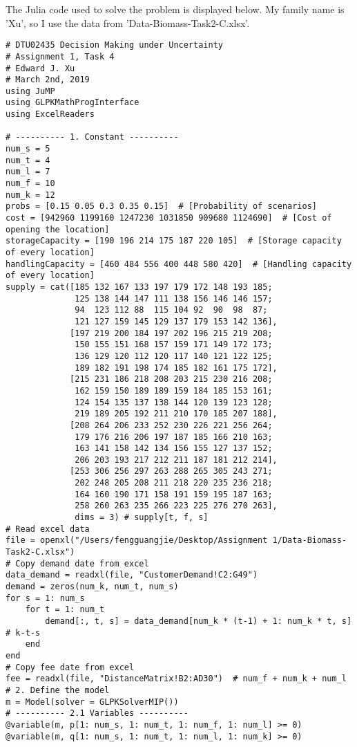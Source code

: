 \documentclass[fleqn,10pt]{wlscirep}
\begin{document}
The Julia code used to solve the problem is displayed below. My family name is 'Xu', so I use the data from 'Data-Biomass-Task2-C.xlsx'.
\begin{lstlisting}
# DTU02435 Decision Making under Uncertainty
# Assignment 1, Task 4
# Edward J. Xu
# March 2nd, 2019
using JuMP
using GLPKMathProgInterface
using ExcelReaders

# ---------- 1. Constant ----------
num_s = 5
num_t = 4
num_l = 7
num_f = 10
num_k = 12
probs = [0.15 0.05 0.3 0.35 0.15]  # [Probability of scenarios]
cost = [942960 1199160 1247230 1031850 909680 1124690]  # [Cost of opening the location]
storageCapacity = [190 196 214 175 187 220 105]  # [Storage capacity of every location]
handlingCapacity = [460 484 556 400 448 580 420]  # [Handling capacity of every location]
supply = cat([185 132 167 133 197 179 172 148 193 185;
              125 138 144 147 111 138 156 146 146 157;
              94  123 112 88  115 104 92  90  98  87;
              121 127 159 145 129 137 179 153 142 136],
             [197 219 200 184 197 202 196 215 219 208;
              150 155 151 168 157 159 171 149 172 173;
              136 129 120 112 120 117 140 121 122 125;
              189 182 191 198 174 185 182 161 175 172],
             [215 231 186 218 208 203 215 230 216 208;
              162 159 150 189 189 159 184 185 153 161;
              124 154 135 137 138 144 120 139 123 128;
              219 189 205 192 211 210 170 185 207 188],
             [208 264 206 233 252 230 226 221 256 264;
              179 176 216 206 197 187 185 166 210 163;
              163 141 158 142 134 156 155 127 137 152;
              206 203 193 217 212 211 187 181 212 214],
             [253 306 256 297 263 288 265 305 243 271;
              202 248 205 208 211 218 220 235 236 218;
              164 160 190 171 158 191 159 195 187 163;
              258 260 263 235 266 223 225 276 270 263],
              dims = 3) # supply[t, f, s]
# Read excel data
file = openxl("/Users/fengguangjie/Desktop/Assignment 1/Data-Biomass-Task2-C.xlsx")
# Copy demand date from excel
data_demand = readxl(file, "CustomerDemand!C2:G49")
demand = zeros(num_k, num_t, num_s)
for s = 1: num_s
    for t = 1: num_t
        demand[:, t, s] = data_demand[num_k * (t-1) + 1: num_k * t, s]  # k-t-s
    end
end
# Copy fee date from excel
fee = readxl(file, "DistanceMatrix!B2:AD30")  # num_f + num_k + num_l
# 2. Define the model
m = Model(solver = GLPKSolverMIP())
# ---------- 2.1 Variables ----------
@variable(m, p[1: num_s, 1: num_t, 1: num_f, 1: num_l] >= 0)
@variable(m, q[1: num_s, 1: num_t, 1: num_l, 1: num_k] >= 0)

\end{lstlisting}
\end{document}
